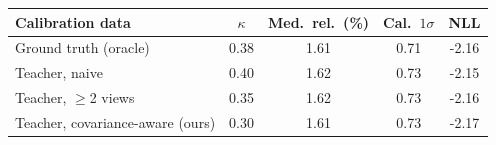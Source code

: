 \begin{tabular}{l c ccc}
\toprule
Calibration data & $\kappa$ & Med.\ rel.\ (\%) & Cal.\ $1\sigma$ & NLL \\
\midrule
Ground truth (oracle) & 0.38 & 1.61 & 0.71 & -2.16 \\
\midrule
Teacher, naive & 0.40 & 1.62 & 0.73 & -2.15 \\
Teacher, $\geq$2 views & 0.35 & 1.62 & 0.73 & -2.16 \\
Teacher, covariance-aware (ours) & 0.30 & 1.61 & 0.73 & -2.17 \\
\bottomrule
\end{tabular}